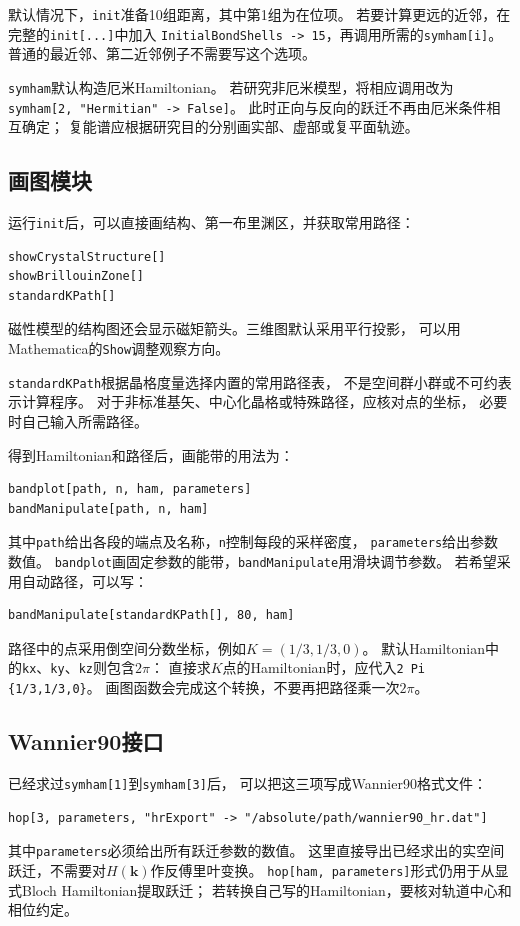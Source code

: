 \documentclass[titlepage,a4paper,12pt,AutoFakeBold]{article}
\begin{document}
默认情况下，\lstinline|init|准备10组距离，其中第1组为在位项。
若要计算更远的近邻，在完整的\lstinline|init[...]|中加入
\lstinline|InitialBondShells -> 15|，再调用所需的\lstinline|symham[i]|。
普通的最近邻、第二近邻例子不需要写这个选项。

\lstinline|symham|默认构造厄米Hamiltonian。
若研究非厄米模型，将相应调用改为
\lstinline|symham[2, "Hermitian" -> False]|。
此时正向与反向的跃迁不再由厄米条件相互确定；
复能谱应根据研究目的分别画实部、虚部或复平面轨迹。

\subsection{画图模块}
运行\lstinline|init|后，可以直接画结构、第一布里渊区，并获取常用路径：
\begin{lstlisting}[numbers=none]
showCrystalStructure[]
showBrillouinZone[]
standardKPath[]
\end{lstlisting}
磁性模型的结构图还会显示磁矩箭头。三维图默认采用平行投影，
可以用Mathematica的\lstinline|Show|调整观察方向。

\lstinline|standardKPath|根据晶格度量选择内置的常用路径表，
不是空间群小群或不可约表示计算程序。
对于非标准基矢、中心化晶格或特殊路径，应核对点的坐标，
必要时自己输入所需路径。

得到Hamiltonian和路径后，画能带的用法为：
\begin{lstlisting}[numbers=none]
bandplot[path, n, ham, parameters]
bandManipulate[path, n, ham]
\end{lstlisting}
其中\lstinline|path|给出各段的端点及名称，\lstinline|n|控制每段的采样密度，
\lstinline|parameters|给出参数数值。
\lstinline|bandplot|画固定参数的能带，\lstinline|bandManipulate|用滑块调节参数。
若希望采用自动路径，可以写：
\begin{lstlisting}[numbers=none]
bandManipulate[standardKPath[], 80, ham]
\end{lstlisting}

路径中的点采用倒空间分数坐标，例如$K=(1/3,1/3,0)$。
默认Hamiltonian中的\lstinline|kx|、\lstinline|ky|、\lstinline|kz|则包含$2\pi$：
直接求$K$点的Hamiltonian时，应代入\lstinline|2 Pi {1/3,1/3,0}|。
画图函数会完成这个转换，不要再把路径乘一次$2\pi$。

\subsection{Wannier90接口}
已经求过\lstinline|symham[1]|到\lstinline|symham[3]|后，
可以把这三项写成Wannier90格式文件：
\begin{lstlisting}[numbers=none]
hop[3, parameters, "hrExport" -> "/absolute/path/wannier90_hr.dat"]
\end{lstlisting}
其中\lstinline|parameters|必须给出所有跃迁参数的数值。
这里直接导出已经求出的实空间跃迁，不需要对$H(\boldsymbol k)$作反傅里叶变换。
\lstinline|hop[ham, parameters]|形式仍用于从显式Bloch Hamiltonian提取跃迁；
若转换自己写的Hamiltonian，要核对轨道中心和相位约定。
\end{document}
